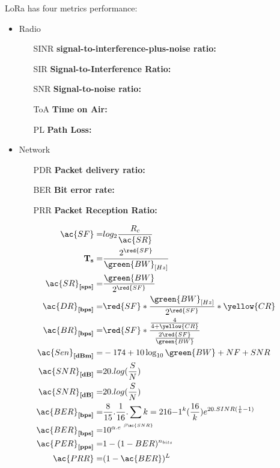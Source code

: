LoRa has four metrics performance:

\begin{itemize}
	\item Radio
	\begin{itemize}
			\item[SINR] \textbf{signal-to-interference-plus-noise ratio:}
			\item[SIR] \textbf{Signal-to-Interference Ratio:}
			\item[SNR] \textbf{Signal-to-noise ratio:}
			\item[ToA] \textbf{Time on Air:}
			\item[PL] \textbf{Path Loss:}

	\end{itemize}
	\item Network
	\begin{itemize}
	\item[PDR] \textbf{Packet delivery ratio:}
	\item[BER] \textbf{Bit error rate:}
	\item[PRR] \textbf{Packet Reception Ratio:}
	\end{itemize}
\end{itemize}

\begin{align}
\ac{SF}                     =& log_{2} \frac{R_{c}}{\ac{SR}}\\
\textbf{T}_{\textbf{s}}     =& \frac{2^{\red{SF}}}{\green{BW}_{[Hz]}}\\
\ac{SR}_{\textbf{[sps]}}    =& \frac{\green{BW}}{2^{\red{SF}}}\\
\ac{DR}_{\textbf{[bps]}}    =& \red{SF}*\frac{\green{BW}_{[Hz]}}{2^{\red{SF}}}*\yellow{CR}\\
\ac{BR}_{\textbf{[bps]}}    =& \red{SF} * \frac{\frac{4}{4+\yellow{CR}}}{\frac{2 \red{SF}}{\green{BW}}}\\
\ac{Sen}_{\textbf{[dBm]}}   =& -174+10 \log _{10} \green{BW} + NF + SNR\\
\ac{SNR}_{\textbf{[dB]}}    =& 20.log(\frac{S}{N})\\
\ac{SNR}_{\textbf{[dB]}}    =& 20.log(\frac{S}{N})\\
\ac{BER}_{\textbf{[bps]}}   =& \frac{8}{15}.\frac{1}{16}.\sum{k=2}{16}{-1^{k}(\frac{16}{k})e^{20.SINR(\frac{1}{k}-1)}}\\
\ac{BER}_{\textbf{[bps]}}   =& 10^{\alpha .e^{\ \beta \tiny\ac{SNR}}}\\
\ac{PER}_{\textbf{[pps]}}   =& 1-(1-BER)^{n_{bits}}\\
\ac{PRR}                    =& (1-\ac{BER})^{L}\\
\end{align}


